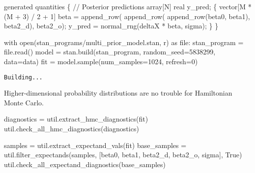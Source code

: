 \documentclass[
  letterpaper,
  DIV=11,
  numbers=noendperiod]{scrartcl}
\newenvironment{Shaded}{\begin{snugshade}}{\end{snugshade}}
\newcommand{\BuiltInTok}[1]{\textcolor[rgb]{0.00,0.23,0.31}{#1}}
\newcommand{\CommentTok}[1]{\textcolor[rgb]{0.37,0.37,0.37}{#1}}
\newcommand{\ControlFlowTok}[1]{\textcolor[rgb]{0.00,0.23,0.31}{#1}}
\newcommand{\DataTypeTok}[1]{\textcolor[rgb]{0.68,0.00,0.00}{#1}}
\newcommand{\DecValTok}[1]{\textcolor[rgb]{0.68,0.00,0.00}{#1}}
\newcommand{\ImportTok}[1]{\textcolor[rgb]{0.00,0.46,0.62}{#1}}
\newcommand{\KeywordTok}[1]{\textcolor[rgb]{0.00,0.23,0.31}{#1}}
\newcommand{\NormalTok}[1]{\textcolor[rgb]{0.00,0.23,0.31}{#1}}
\newcommand{\OperatorTok}[1]{\textcolor[rgb]{0.37,0.37,0.37}{#1}}
\newcommand{\StringTok}[1]{\textcolor[rgb]{0.13,0.47,0.30}{#1}}
\newcommand{\VariableTok}[1]{\textcolor[rgb]{0.07,0.07,0.07}{#1}}
\begin{document}
\begin{codelisting}
\begin{Shaded}
\begin{Highlighting}[]
\KeywordTok{generated quantities}\NormalTok{ \{}
  \CommentTok{// Posterior predictions}
  \DataTypeTok{array}\NormalTok{[N] }\DataTypeTok{real}\NormalTok{ y\_pred;}
\NormalTok{  \{}
    \DataTypeTok{vector}\NormalTok{[M * (M + }\DecValTok{3}\NormalTok{) / }\DecValTok{2}\NormalTok{ + }\DecValTok{1}\NormalTok{] beta}
\NormalTok{      = append\_row(}
\NormalTok{          append\_row(}
\NormalTok{            append\_row(beta0, beta1), }
\NormalTok{          beta2\_d),}
\NormalTok{        beta2\_o);}
\NormalTok{    y\_pred = normal\_rng(deltaX * beta, sigma);}
\NormalTok{  \}}
\NormalTok{\}}
\end{Highlighting}
\end{Shaded}

\end{codelisting}

\begin{Shaded}
\begin{Highlighting}[]
\ControlFlowTok{with} \BuiltInTok{open}\NormalTok{(}\StringTok{\textquotesingle{}stan\_programs/multi\_prior\_model.stan\textquotesingle{}}\NormalTok{, }\StringTok{\textquotesingle{}r\textquotesingle{}}\NormalTok{) }\ImportTok{as} \BuiltInTok{file}\NormalTok{:}
\NormalTok{  stan\_program }\OperatorTok{=} \BuiltInTok{file}\NormalTok{.read()}
\NormalTok{model }\OperatorTok{=}\NormalTok{ stan.build(stan\_program, random\_seed}\OperatorTok{=}\DecValTok{5838299}\NormalTok{, data}\OperatorTok{=}\NormalTok{data)}
\NormalTok{fit }\OperatorTok{=}\NormalTok{ model.sample(num\_samples}\OperatorTok{=}\DecValTok{1024}\NormalTok{, refresh}\OperatorTok{=}\DecValTok{0}\NormalTok{)}
\end{Highlighting}
\end{Shaded}

\begin{verbatim}
Building...
\end{verbatim}

Higher-dimensional probability distributions are no trouble for
Hamiltonian Monte Carlo.

\begin{Shaded}
\begin{Highlighting}[]
\NormalTok{diagnostics }\OperatorTok{=}\NormalTok{ util.extract\_hmc\_diagnostics(fit)}
\NormalTok{util.check\_all\_hmc\_diagnostics(diagnostics)}

\NormalTok{samples }\OperatorTok{=}\NormalTok{ util.extract\_expectand\_vals(fit)}
\NormalTok{base\_samples }\OperatorTok{=}\NormalTok{ util.filter\_expectands(samples,}
\NormalTok{                                      [}\StringTok{\textquotesingle{}beta0\textquotesingle{}}\NormalTok{, }\StringTok{\textquotesingle{}beta1\textquotesingle{}}\NormalTok{,}
                                       \StringTok{\textquotesingle{}beta2\_d\textquotesingle{}}\NormalTok{, }\StringTok{\textquotesingle{}beta2\_o\textquotesingle{}}\NormalTok{,}
                                       \StringTok{\textquotesingle{}sigma\textquotesingle{}}\NormalTok{],}
                                      \VariableTok{True}\NormalTok{)}
\NormalTok{util.check\_all\_expectand\_diagnostics(base\_samples)}
\end{Highlighting}
\end{Shaded}
\end{document}
